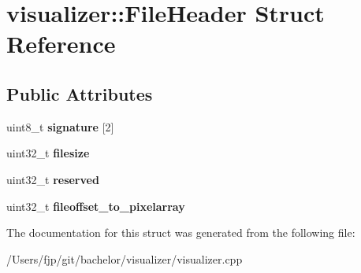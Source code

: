 \hypertarget{structvisualizer_1_1_file_header}{}\section{visualizer\+:\+:File\+Header Struct Reference}
\label{structvisualizer_1_1_file_header}
\subsection*{Public Attributes}
\begin{DoxyCompactItemize}
\item 
\mbox{\label{structvisualizer_1_1_file_header_a21d5199fdc8fdf293374de91564bbbe3}} 
uint8\+\_\+t {\bfseries signature} \mbox{[}2\mbox{]}
\item 
\mbox{\label{structvisualizer_1_1_file_header_ad79e04a6e593e9448a151049ef8290ab}} 
uint32\+\_\+t {\bfseries filesize}
\item 
\mbox{\label{structvisualizer_1_1_file_header_abe8a37ffc28ff244e92680e8563537c5}} 
uint32\+\_\+t {\bfseries reserved}
\item 
\mbox{\label{structvisualizer_1_1_file_header_ab24f1ce618c07cdfd8afc2b3d4455d3b}} 
uint32\+\_\+t {\bfseries fileoffset\+\_\+to\+\_\+pixelarray}
\end{DoxyCompactItemize}


The documentation for this struct was generated from the following file\+:\begin{DoxyCompactItemize}
\item 
/\+Users/fjp/git/bachelor/visualizer/visualizer.\+cpp\end{DoxyCompactItemize}
